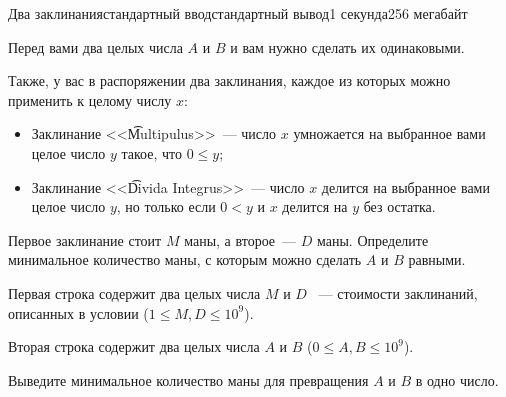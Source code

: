\begin{problem}{Два заклинания}{стандартный ввод}{стандартный вывод}{1 секунда}{256 мегабайт}

Перед вами два целых числа $A$ и $B$ и вам нужно сделать их одинаковыми. 

Также, у вас в распоряжении два заклинания, каждое из которых можно применить к целому числу $x$:

\begin{itemize}
\item Заклинание <<\t{Multipulus}>>~--- число $x$ умножается на выбранное вами целое число $y$ такое, что $0 \leq y$;

\item Заклинание <<\t{Divida Integrus}>>~--- число $x$ делится на выбранное вами целое число $y$, но только если $0 < y$ и $x$ делится на $y$ без остатка.
\end{itemize}

Первое заклинание стоит $M$ маны, а второе~--- $D$ маны. Определите минимальное количество маны, с которым можно сделать $A$ и $B$ равными.

\InputFile
Первая строка содержит два целых числа $M$ и $D$ ~--- стоимости заклинаний, описанных в условии ($1 \leq M, D \leq 10^9$).

Вторая строка содержит два целых числа $A$ и $B$ ($0 \leq A, B \leq 10^9$).

\OutputFile
Выведите минимальное количество маны для превращения $A$ и $B$ в одно число.

\Examples

\begin{example}
%
%
\end{example}

\end{problem}

